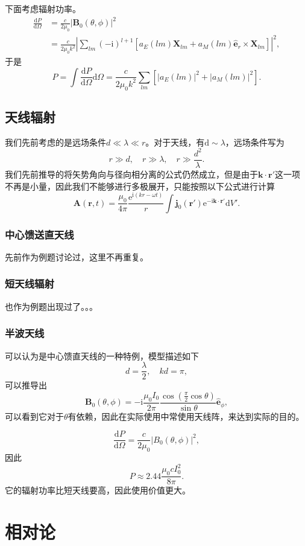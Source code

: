 \documentclass[UTF8]{ctexbook}
\newcommand{\e}{\mathrm{e}}
\renewcommand{\d}{\mathrm{d}}
\renewcommand{\b}{\boldsymbol}
\renewcommand{\i}{\mathrm{i}}
\numberwithin{equation}{chapter}
\begin{document}
	下面考虑辐射功率。
	\begin{align*}
		\frac{\d P}{\d \Omega}&=\frac{c}{2\mu_0}|\b{B}_0(\theta,\phi)|^2 \\
		&=\frac{c}{2\mu_0 k^2}|\sum_{lm}(-\i)^{l+1}\left[a_E(lm)\b{X}_{lm}+a_M(lm)\hat{\b{e}}_r\times\b{X}_{lm}\right]|^2,
	\end{align*}
	于是
	\[P=\int\frac{\d P}{\d \Omega}\d \Omega=\frac{c}{2\mu_0 k^2}\sum_{lm}\left[|a_E(lm)|^2+|a_M(lm)|^2\right].\]
	
	\section{天线辐射}
	我们先前考虑的是远场条件$d\ll \lambda \ll r$。对于天线，有$\d\sim\lambda$，远场条件写为
	\[r\gg d,\quad r\gg \lambda,\quad r\gg \frac{d^2}{\lambda}.\]
	我们先前推导的将矢势角向与径向相分离的公式仍然成立，但是由于$\b{k}\cdot\b{r}'$这一项不再是小量，因此我们不能够进行多极展开，只能按照以下公式进行计算
	\[\b{A}(\b{r},t)=\frac{\mu_0}{4\pi}\frac{\e^{\i(kr-\omega t)}}{r}\int \b{j}_0(\b{r}')\e^{-\i \b{k}\cdot\b{r}'}\d V'.\]
	
	\subsection{中心馈送直天线}
	先前作为例题讨论过，这里不再重复。
	
	\subsection{短天线辐射}
	也作为例题出现过了。。。
	
	\subsection{半波天线}
	可以认为是中心馈直天线的一种特例，模型描述如下
	\[d=\frac{\lambda}{2},\quad kd=\pi,\]
	可以推导出
	\[\b{B}_0(\theta,\phi)=-\i\frac{\mu_0I_0}{2\pi}\frac{\cos\left(\frac{\pi}{2}\cos\theta\right)}{\sin\theta}\hat{\b{e}}_\phi,\]
	可以看到它对于$\theta$有依赖，因此在实际使用中常使用天线阵，来达到实际的目的。
	
	\[\frac{\d P}{\d \Omega}=\frac{c}{2\mu_0}|B_0(\theta,\phi)|^2,\]
	因此
	\[P\approx 2.44\frac{\mu_0cI_0^2}{8\pi}.\]
	它的辐射功率比短天线要高，因此使用价值更大。
	
	\chapter{相对论}
	
\end{document}
